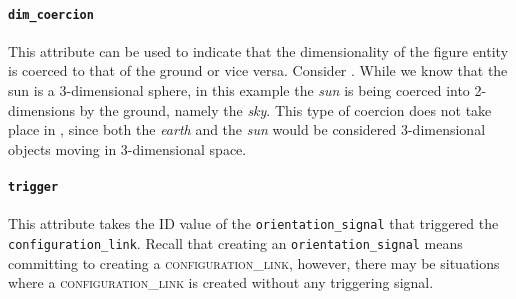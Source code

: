 \documentclass[11pt]{article}
\begin{document}
\iffalse
Looking back at \Cref{ex:cat}, the configuration of the entities involved is such that the bottom of the cat is on the top of the table. The \texttt{figure\_config} attribute is compulsory whereas the ground config attribute is optional; \Cref{ex:ground} shows an optional \texttt{ground\_config} whereas in \Cref{ex:no_ground} the \texttt{ground\_config} is requisite.

\fi

\label{ex:ground_requirement}


\paragraph{\texttt{dim\_coercion}} %
\label{par:dim_coercion}

This attribute can be used to indicate that the dimensionality of the figure entity is coerced to that of the ground or vice versa. Consider . While we know that the sun is a 3-dimensional sphere, in this example the \emph{sun} is being coerced into 2-dimensions by the ground, namely the \emph{sky}. This type of coercion does not take place in , since both the \emph{earth} and the \emph{sun} would be considered 3-dimensional objects moving in 3-dimensional space.

\label{ex:coercion}



\paragraph{\texttt{trigger}} %
\label{par:trigger}
This attribute takes the ID value of the \texttt{orientation\_signal} that triggered the \texttt{configuration\_link}. Recall that creating an \texttt{orientation\_signal} means committing to creating a \textsc{configuration\_link}, however, there may be situations where a \textsc{configuration\_link} is created without any triggering signal.
\end{document}

